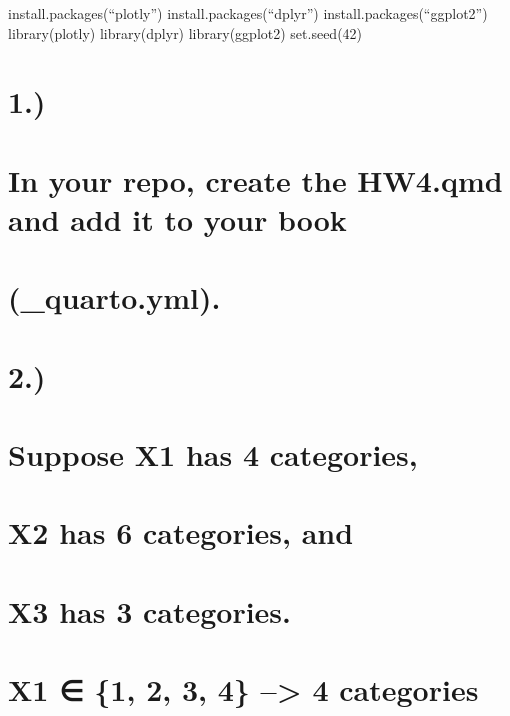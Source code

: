 \documentclass[
  letterpaper,
  DIV=11,
  numbers=noendperiod]{scrreprt}
\begin{document}
install.packages(``plotly'') install.packages(``dplyr'')
install.packages(``ggplot2'') library(plotly) library(dplyr)
library(ggplot2) set.seed(42)


\chapter{1.)}\label{section}


\chapter{In your repo, create the HW4.qmd and add it to your
book}\label{in-your-repo-create-the-hw4.qmd-and-add-it-to-your-book}


\chapter{(\_quarto.yml).}\label{quarto.yml.}


\chapter{2.)}\label{section-1}


\chapter{Suppose X1 has 4
categories,}\label{suppose-x1-has-4-categories}


\chapter{X2 has 6 categories, and}\label{x2-has-6-categories-and}


\chapter{X3 has 3 categories.}\label{x3-has-3-categories.}


\chapter{X1 ∈ \{1, 2, 3, 4\} --\textgreater{} 4
categories}\label{x1-1-2-3-4-4-categories}
\end{document}
